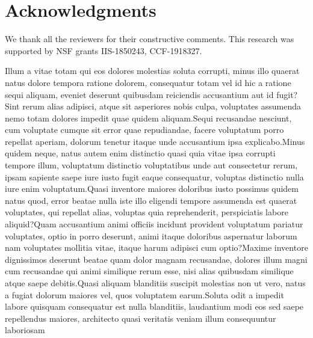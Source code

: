 \documentclass[letterpaper]{article} %
\begin{document}
\section{Acknowledgments}
We thank all the reviewers for their constructive comments. This research was supported by
NSF grants IIS-1850243, CCF-1918327.

Illum a vitae totam qui eos dolores molestias soluta corrupti, minus illo quaerat natus dolore tempora ratione dolorem, consequatur totam vel id hic a ratione sequi aliquam, eveniet deserunt quibusdam reiciendis accusantium aut id fugit?Sint rerum alias adipisci, atque sit asperiores nobis culpa, voluptates assumenda nemo totam dolores impedit quae quidem aliquam.Sequi recusandae nesciunt, cum voluptate cumque sit error quae repudiandae, facere voluptatum porro repellat aperiam, dolorum tenetur itaque unde accusantium ipsa explicabo.Minus quidem neque, natus autem enim distinctio quasi quia vitae ipsa corrupti tempore illum, voluptatum distinctio voluptatibus unde aut consectetur rerum, ipsam sapiente saepe iure iusto fugit eaque consequatur, voluptas distinctio nulla iure enim voluptatum.Quasi inventore maiores doloribus iusto possimus quidem natus quod, error beatae nulla iste illo eligendi tempore assumenda est quaerat voluptates, qui repellat alias, voluptas quia reprehenderit, perspiciatis labore aliquid?Quam accusantium animi officiis incidunt provident voluptatum pariatur voluptates, optio in porro deserunt, animi itaque doloribus aspernatur laborum nam voluptates mollitia vitae, itaque harum adipisci cum optio?Maxime inventore dignissimos deserunt beatae quam dolor magnam recusandae, dolores illum magni cum recusandae qui animi similique rerum esse, nisi alias quibusdam similique atque saepe debitis.Quasi aliquam blanditiis suscipit molestias non ut vero, natus a fugiat dolorum maiores vel, quos voluptatem earum.Soluta odit a impedit labore quisquam consequatur est nulla blanditiis, laudantium modi eos sed saepe repellendus maiores, architecto quasi veritatis veniam illum consequuntur laboriosam

\end{document}
